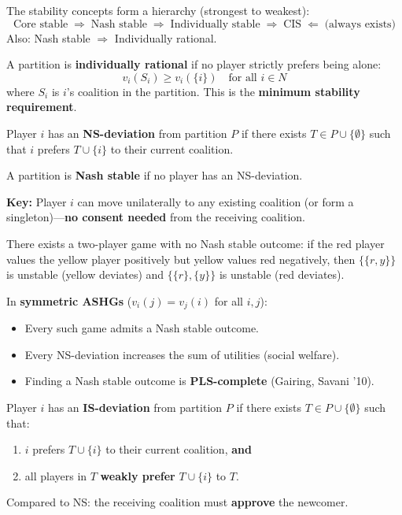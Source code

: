 The stability concepts form a hierarchy (strongest to weakest):
\[
\text{Core stable} \;\Rightarrow\; \text{Nash stable} \;\Rightarrow\; \text{Individually stable} \;\Rightarrow\; \text{CIS} \;\Leftarrow\; \text{(always exists)}
\]
Also: Nash stable $\Rightarrow$ Individually rational.

\begin{defbox}
A partition is \textbf{individually rational} if no player strictly prefers being alone:
\[
v_i(S_i) \geq v_i(\{i\}) \quad \text{for all } i \in N
\]
where $S_i$ is $i$'s coalition in the partition. This is the \textbf{minimum stability requirement}.
\end{defbox}

\begin{defbox}
Player $i$ has an \textbf{NS-deviation} from partition $P$ if there exists $T \in P \cup \{\emptyset\}$ such that $i$ prefers $T \cup \{i\}$ to their current coalition.

A partition is \textbf{Nash stable} if no player has an NS-deviation.

\textbf{Key:} Player $i$ can move unilaterally to any existing coalition (or form a singleton)---\textbf{no consent needed} from the receiving coalition.
\end{defbox}

\begin{thmbox}
There exists a two-player game with no Nash stable outcome: if the red player values the yellow player positively but yellow values red negatively, then $\{\{r,y\}\}$ is unstable (yellow deviates) and $\{\{r\},\{y\}\}$ is unstable (red deviates).
\end{thmbox}

\begin{thmbox}
In \textbf{symmetric ASHGs} ($v_i(j) = v_j(i)$ for all $i, j$):
\begin{itemize}
  \item Every such game admits a Nash stable outcome.
  \item Every NS-deviation increases the sum of utilities (social welfare).
  \item Finding a Nash stable outcome is \textbf{PLS-complete} (Gairing, Savani '10).
\end{itemize}
\end{thmbox}

\begin{defbox}
Player $i$ has an \textbf{IS-deviation} from partition $P$ if there exists $T \in P \cup \{\emptyset\}$ such that:
\begin{enumerate}
  \item $i$ prefers $T \cup \{i\}$ to their current coalition, \textbf{and}
  \item all players in $T$ \textbf{weakly prefer} $T \cup \{i\}$ to $T$.
\end{enumerate}

Compared to NS: the receiving coalition must \textbf{approve} the newcomer.
\end{defbox}

